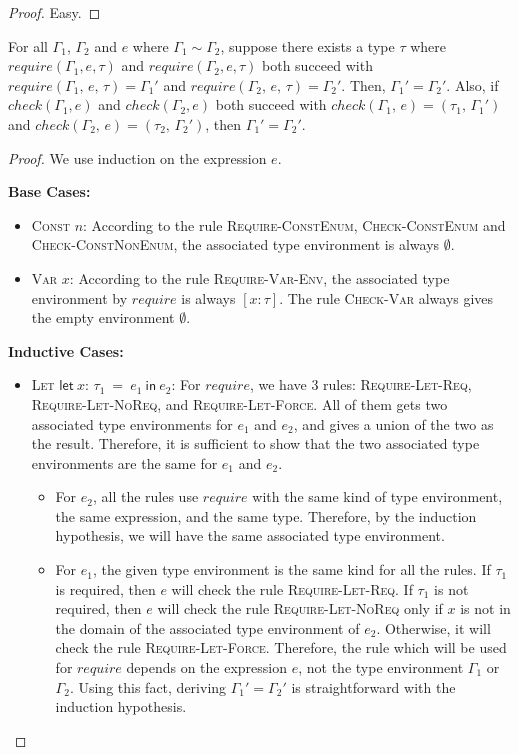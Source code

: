 \documentclass[peerreview, 10pt]{IEEEtran}
\newcommand{\lett}[4]{\ensuremath{\mathsf{let}\ #1\mathsf{:}\,#2\ \mathsf{=}\ #3\ \mathsf{in}\ #4}}
\newcommand{\checktype}[4]{\ensuremath{{check}(#1,\,#2)=(#3,\,#4)}}
\newcommand{\requiretype}[4]{\ensuremath{{require}(#1,\,#2,\,#3)=#4}}
\begin{document}
\begin{proof}
    Easy.
\end{proof}

\begin{theorem}
    \label{thm:assoc-iden}
    For all $\Gamma_1$, $\Gamma_2$ and $e$ where $\Gamma_1\sim\Gamma_2$, suppose there exists a type $\tau$ where $require(\Gamma_1, e, \tau)$ and $require(\Gamma_2, e, \tau)$ both succeed with $\requiretype{\Gamma_1}{e}{\tau}{\Gamma_1'}$ and $\requiretype{\Gamma_2}{e}{\tau}{\Gamma_2'}$. Then, $\Gamma_1'=\Gamma_2'$. Also, if $check(\Gamma_1, e)$ and $check(\Gamma_2, e)$ both succeed with $\checktype{\Gamma_1}{e}{\tau_1}{\Gamma_1'}$ and $\checktype{\Gamma_2}{e}{\tau_2}{\Gamma_2'}$, then $\Gamma_1'=\Gamma_2'$.
\end{theorem}

\begin{proof}
    We use induction on the expression $e$.

    \textbf{Base Cases:}
    \begin{itemize}
        \item \textsc{Const} $n$: According to the rule \textsc{Require-ConstEnum}, \textsc{Check-ConstEnum} and \textsc{Check-ConstNonEnum}, the associated type environment is always $\emptyset$.
        \item \textsc{Var} $x$: According to the rule \textsc{Require-Var-Env}, the associated type environment by $require$ is always $[x:\tau]$. The rule \textsc{Check-Var} always gives the empty environment $\emptyset$.
    \end{itemize}

    \textbf{Inductive Cases:}
    \begin{itemize}
        \item \textsc{Let} \lett{x}{\tau_1}{e_1}{e_2}: For $require$, we have 3 rules: \textsc{Require-Let-Req}, \textsc{Require-Let-NoReq}, and \textsc{Require-Let-Force}. All of them gets two associated type environments for $e_1$ and $e_2$, and gives a union of the two as the result. Therefore, it is sufficient to show that the two associated type environments are the same for $e_1$ and $e_2$.
        \begin{itemize}
            \item For $e_2$, all the rules use $require$ with the same kind of type environment, the same expression, and the same type. Therefore, by the induction hypothesis, we will have the same associated type environment.
            \item For $e_1$, the given type environment is the same kind for all the rules. If $\tau_1$ is required, then $e$ will check the rule \textsc{Require-Let-Req}. If $\tau_1$ is not required, then $e$ will check the rule \textsc{Require-Let-NoReq} only if $x$ is not in the domain of the associated type environment of $e_2$. Otherwise, it will check the rule \textsc{Require-Let-Force}. Therefore, the rule which will be used for $require$ depends on the expression $e$, not the type environment $\Gamma_1$ or $\Gamma_2$. Using this fact, deriving $\Gamma_1'=\Gamma_2'$ is straightforward with the induction hypothesis.
        \end{itemize}


\end{itemize}
\end{proof}
\end{document}
